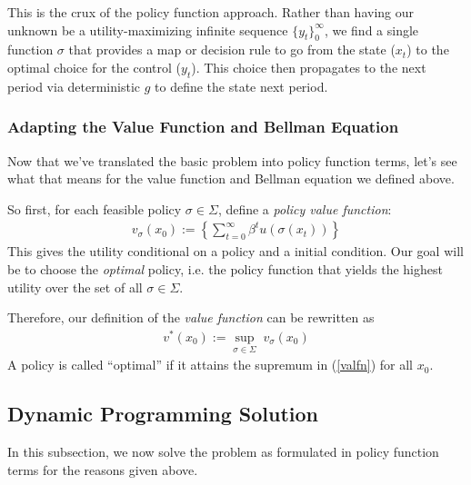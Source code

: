 \documentclass[a4paper,12pt]{scrartcl}
\begin{document}
This is the crux of the policy function approach.
Rather than having our unknown be a utility-maximizing
infinite sequence $\{y_t\}^\infty_0$, we find a single
function $\sigma$ that provides a map or decision rule to
go from the state ($x_t$) to the optimal choice for the
control ($y_t$).  This choice then propagates to the next
period via deterministic $g$ to define the state next
period.

\subsubsection{Adapting the Value Function and Bellman
Equation}

Now that we've translated the basic problem into policy
function terms, let's see what that means for the value
function and Bellman equation we defined above.

So first, for each feasible policy $\sigma\in
\Sigma$, define a \emph{policy value
function}:
\begin{align*}
  v_\sigma(x_0) :=
  \left\{ \sum^\infty_{t=0} \beta^t u(\sigma(x_t)) \right\}
\end{align*}
This gives the utility conditional on a policy and a
initial condition.  Our goal will be to choose the
\emph{optimal} policy, i.e. the policy function that yields
the highest utility over the set of all $\sigma \in
\Sigma$.

Therefore, our definition of the \emph{value function} can
be rewritten as
\begin{align}
  \label{valfn}
  v^*(x_0) := \sup_{\sigma\in\Sigma} \; v_\sigma(x_0)
\end{align}
A policy is called ``optimal'' if it attains the supremum in
(\ref{valfn}) for all $x_0$. 


\subsection{Dynamic Programming Solution}

In this subsection, we now solve the problem as formulated
in policy function terms for the reasons given above.







% 
\end{document}
